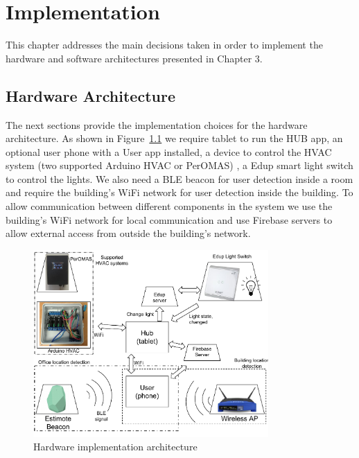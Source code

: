 \chapter{Implementation}
\label{chapter:implementation}

This chapter addresses the main decisions taken in order to implement the hardware and software architectures presented in Chapter 3.


\section{Hardware Architecture}\label{hardware_arch_imp}


The next sections provide the implementation choices for the hardware architecture. As shown in Figure~\ref{imp:architecture_system} we require tablet to run the HUB app, an optional user phone with a User app installed, a device to control the HVAC system (two supported Arduino HVAC or PerOMAS) , a Edup smart light switch to control the lights. We also need a \ac{BLE} beacon for user detection inside a room and require the building's \ac{WiFi} network for user detection inside the building.
To allow communication between different components in the system we use the building's \ac{WiFi} network for local communication and use Firebase servers to allow external access from outside the building's network.


\begin{figure}[h]
\centering
\includegraphics[width=0.8\textwidth]{Figures/harware_arch_imp}
\caption{Hardware implementation architecture}
\label{imp:architecture_system}
\end{figure}





